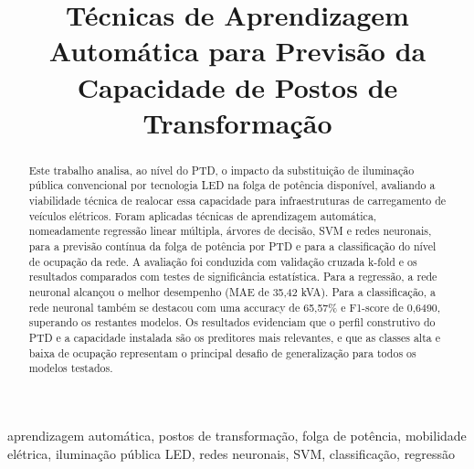 \documentclass[conference]{IEEEtran}
\begin{document}
\title{Técnicas de Aprendizagem Automática para Previsão da Capacidade de Postos de Transformação}

\author{
\IEEEoverridecommandlockouts
{}
\and
{}
\and
{}
}

\maketitle

\begin{abstract}
Este trabalho analisa, ao nível do PTD, o impacto da substituição de iluminação pública convencional por tecnologia LED na folga de potência disponível, avaliando a viabilidade técnica de realocar essa capacidade para infraestruturas de carregamento de veículos elétricos. Foram aplicadas técnicas de aprendizagem automática, nomeadamente regressão linear múltipla, árvores de decisão, SVM e redes neuronais, para a previsão contínua da folga de potência por PTD e para a classificação do nível de ocupação da rede. A avaliação foi conduzida com validação cruzada k-fold e os resultados comparados com testes de significância estatística. Para a regressão, a rede neuronal alcançou o melhor desempenho (MAE de 35,42 kVA). Para a classificação, a rede neuronal também se destacou com uma accuracy de 65,57\% e F1-score de 0,6490, superando os restantes modelos. Os resultados evidenciam que o perfil construtivo do PTD e a capacidade instalada são os preditores mais relevantes, e que as classes alta e baixa de ocupação representam o principal desafio de generalização para todos os modelos testados.
\end{abstract}

\begin{IEEEkeywords}
aprendizagem automática, postos de transformação, folga de potência, mobilidade elétrica, iluminação pública LED, redes neuronais, SVM, classificação, regressão
\end{IEEEkeywords}
\end{document}
